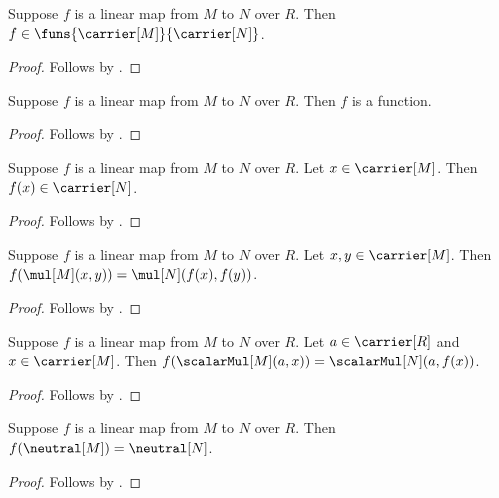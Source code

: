 \begin{proposition}\label{linear_map_type}
    Suppose $f$ is a linear map from $M$ to $N$ over $R$.
    Then $f\in\funs{\carrier[M]}{\carrier[N]}$.
\end{proposition}
\begin{proof}
    Follows by
        .
\end{proof}

\begin{corollary}\label{linear_map_is_function}
    Suppose $f$ is a linear map from $M$ to $N$ over $R$.
    Then $f$ is a function.
\end{corollary}
\begin{proof}
    Follows by .
\end{proof}

\begin{corollary}\label{linear_map_apply_type}
    Suppose $f$ is a linear map from $M$ to $N$ over $R$.
    Let $x\in\carrier[M]$.
    Then $f(x)\in\carrier[N]$.
\end{corollary}
\begin{proof}
    Follows by .
\end{proof}

\begin{proposition}\label{linear_map_addition}
    Suppose $f$ is a linear map from $M$ to $N$ over $R$.
    Let $x,y\in\carrier[M]$.
    Then $f(\mul[M](x,y))=\mul[N](f(x),f(y))$.
\end{proposition}
\begin{proof}
    Follows by
        .
\end{proof}

\begin{proposition}\label{linear_map_scalar}
    Suppose $f$ is a linear map from $M$ to $N$ over $R$.
    Let $a\in\carrier[R]$ and $x\in\carrier[M]$.
    Then $f(\scalarMul[M](a,x))=\scalarMul[N](a,f(x))$.
\end{proposition}
\begin{proof}
    Follows by .
\end{proof}

\begin{theorem}\label{linear_map_zero}
    Suppose $f$ is a linear map from $M$ to $N$ over $R$.
    Then $f(\neutral[M])=\neutral[N]$.
\end{theorem}
\begin{proof}
    Follows by
        .
\end{proof}

